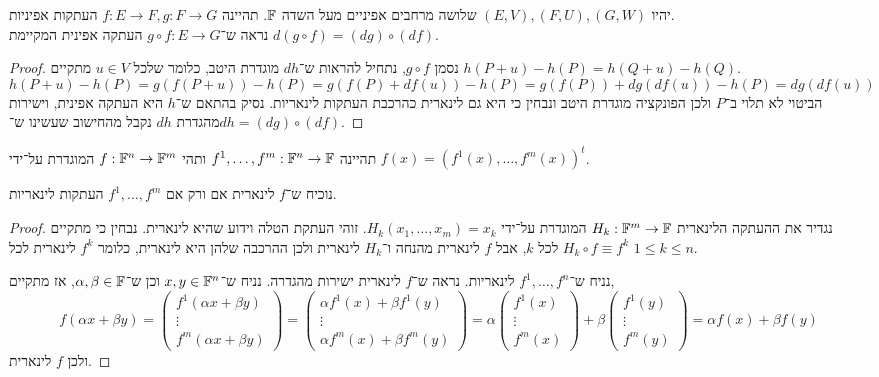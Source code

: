 \question{}
יהיו $(E, V), (F, U), (G, W)$ שלושה מרחבים אפיניים מעל השדה $\mathbb{F}$.
תהיינה $f : E \to F, g : F \to G$ העתקות אפיניות. \\
נראה ש־$g \circ f : E \to G$ העתקה אפינית המקיימת $d(g \circ f) = (dg) \circ (df)$.
\begin{proof}
	נסמן $g \circ f$, נתחיל להראות ש־$dh$ מוגדרת היטב, כלומר שלכל $u \in V$ מתקיים $h(P + u) - h(P) = h(Q + u) - h(Q)$.
	\[
		h(P + u) - h(P)
		= g(f(P + u)) - h(P)
		= g(f(P) + df(u)) - h(P)
		= g(f(P)) + dg(df(u)) - h(P)
		= dg(df(u)) 
	\]
	הביטוי לא תלוי ב־$P$ ולכן הפונקציה מוגדרת היטב ונבחין כי היא גם לינארית כהרכבת העתקות לינאריות.
	נסיק בהתאם ש־$h$ היא העתקה אפינית, וישירות מהגדרת $dh$ נקבל מהחישוב שעשינו ש־$dh = (dg) \circ (df)$.
\end{proof}

\question{}
תהיינה $f^1, \ldots, f^m : \mathbb{F}^n \to \mathbb{F}$ ותהי $f : \mathbb{F}^n \to \mathbb{F}^m$ המוגדרת על־ידי $f(x) = {(f^1(x), \ldots, f^m(x))}^t$.

\subquestion{}
נוכיח ש־$f$ לינארית אם ורק אם $f^1, \ldots, f^m$ העתקות לינאריות.
\begin{proof}
	נגדיר את ההעתקה הלינארית $H_k : \mathbb{F}^m \to \mathbb{F}$ המוגדרת על־ידי $H_k(x_1, \ldots, x_m) = x_k$.
	זוהי העתקת הטלה וידוע שהיא לינארית.
	נבחין כי מתקיים $H_k \circ f \equiv f^k$ לכל $k$, אבל $f$ לינארית מהנחה ו־$H_k$ לינארית ולכן ההרכבה שלהן היא לינארית, כלומר $f^k$ לינארית לכל $1 \le k \le n$.

	נניח ש־$f^1, \ldots, f^n$ לינאריות.
	נראה ש־$f$ לינארית ישירות מהגדרה.
	נניח ש־$x, y \in \mathbb{F}^n$ וכן ש־$\alpha, \beta \in \mathbb{F}$, אז מתקיים,
	\[
		f(\alpha x + \beta y)
		= \begin{pmatrix} f^1(\alpha x + \beta y) \\ \vdots \\ f^m(\alpha x + \beta y) \end{pmatrix} 
		= \begin{pmatrix} \alpha f^1(x) + \beta f^1(y) \\ \vdots \\ \alpha f^m(x) + \beta f^m(y) \end{pmatrix} 
		= \alpha \begin{pmatrix} f^1(x) \\ \vdots \\ f^m(x) \end{pmatrix} + \beta \begin{pmatrix} f^1(y) \\ \vdots \\ f^m(y) \end{pmatrix} 
		= \alpha f(x) + \beta f(y)
	\]
	ולכן $f$ לינארית.
\end{proof}

